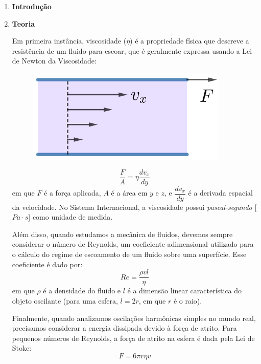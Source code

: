 \documentclass[a4paper, 12pt]{article}
\begin{document}
	\begin{multicols}{2} \begin{enumerate}
		\item \textbf{Introdução}
			
		\item \textbf{Teoria}
			\setlength{\parindent}{4ex}
			\par Em primeira instância, viscosidade ($\eta$) é a propriedade física que descreve a resistência de um fluido para escoar, que é geralmente expressa usando a Lei de Newton da Viscosidade:
				\begin{figure}[H]
					\centering
					\includegraphics[scale=0.6]{./img/viscosidade.png}
				\end{figure}
				\begin{equation}
					\frac{F}{A} = \eta \dfrac{dv_x}{dy}
				\end{equation}
				em que $F$ é a força aplicada, $A$ é a área em $y$ e $z$, e $\dfrac{dv_x}{dy}$ é a derivada espacial da velocidade. No Sistema Internacional, a viscosidade possui \textit{pascal-segundo} [$Pa \cdot s$] como unidade de medida.
				\par Além disso, quando estudamos a mecânica de fluidos, devemos sempre considerar o número de Reynolds, um coeficiente adimensional utilizado para o cálculo do regime de escoamento de um fluido sobre uma superfície. Esse coeficiente é dado por:
				\begin{equation}
					Re = \frac{\rho v l}{\eta}
				\end{equation}
				em que $\rho$ é a densidade do fluido e $l$ é a dimensão linear característica do objeto oscilante (para uma esfera, $l = 2 r$, em que $r$ é o raio).
				\par Finalmente, quando analizamos oscilações harmônicas simples no mundo real, precisamos considerar a energia dissipada devido à força de atrito. Para pequenos números de Reynolds, a força de atrito na esfera é dada pela Lei de Stoke:
				\begin{equation}
					F = 6 \pi r \eta v
				\end{equation}

\end{enumerate}
\end{multicols}
\end{document}
